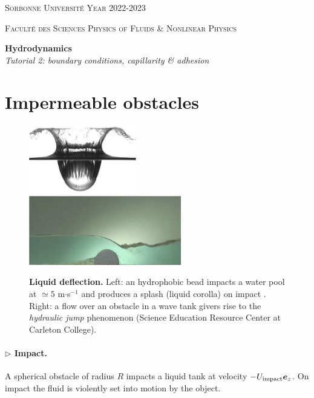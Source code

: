 \documentclass[11pt,a4paper]{article}
\newcommand{\be}{\matrixsym e}
\newcommand{\prg}[1]{\paragraph{$\rhd$ #1}}
\begin{document}
\setlength{\unitlength}{1cm}
\noindent
\parbox{\textwidth}{
\textsc{
Sorbonne Université  
\hfill
Year 2022-2023
}
}
\parbox{\textwidth}{
\textsc{
Faculté des Sciences
\hfill
Physics of Fluids \& Nonlinear Physics
}
}

\begin{center}
\Large
\textbf{Hydrodynamics} \\ 
\textsl{Tutorial 2: boundary conditions, capillarity \& adhesion} \\[1ex]
\end{center}

\section{Impermeable obstacles}
\togglefalse{corrige}

\begin{figure}[ht]
    \centering
    \includegraphics[height=3cm,valign=m]{splash.jpg}
    \hspace{1cm}
    \includegraphics[height=3cm,valign=m]{flow_over_weir.jpg}
    \caption[Caption for LOF]{\textbf{Liquid deflection.} Left: an hydrophobic bead impacts a water pool at $\simeq 5$ m$\cdot$s$^{-1}$ and produces a splash (liquid corolla) on impact \citep{Eggers2007}. Right: a flow over an obstacle in a wave tank givers rise to the \textit{hydraulic jump} phenomenon (Science Education Resource Center at Carleton College\setcounter{footnote}{0}\footnotemark).}
    \label{fig:obstacle}
\end{figure}
\prg{Impact.}
A spherical obstacle of radius $R$ impacts a liquid tank at velocity $-U_\text{impact} \be_{z}$. On impact the fluid is violently set into motion by the object.
\end{document}
